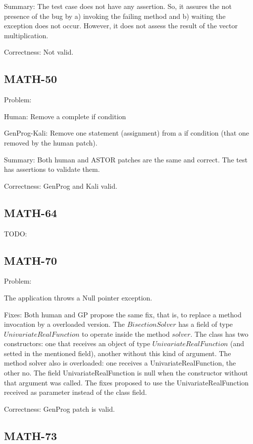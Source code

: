 \documentclass{article}
\newcommand{\todo}[1]{{\color{red}TODO: #1}}
\begin{document}
Summary:
The test case does not have any assertion.
So, it assures the not presence of the bug by a) invoking the failing method and b) waiting the exception does not occur. 
However, it does not assess the result of the vector multiplication.

Correctness: Not valid.

\subsection{MATH-50}

Problem:

Human: 
Remove a complete if condition

GenProg-Kali:
Remove one statement (assignment) from a if condition (that one removed by the human patch).

Summary:
Both human and ASTOR patches are the same and correct. 
The test has assertions to validate them.

Correctness: GenProg and Kali valid.

\subsection{MATH-64}
\todo{}


\subsection{MATH-70}

Problem:

The application throws a Null pointer exception.

Fixes:
Both human and GP propose the same fix, that is, to replace a method invocation by a overloaded version.
The $BisectionSolver$ has a field of type $UnivariateRealFunction$ to operate inside the method $solver$. 
The class has two constructors: one that receives an object of type $UnivariateRealFunction$  (and setted in the mentioned field), another without this kind of argument. 
The method solver also is overloaded: one receives a UnivariateRealFunction, the other no.  
The field UnivariateRealFunction is null when the constructor without that argument was called.
The fixes proposed to use the UnivariateRealFunction received as parameter instead of the class field.

Correctness: GenProg patch is valid.

\subsection{MATH-73}
\end{document}
